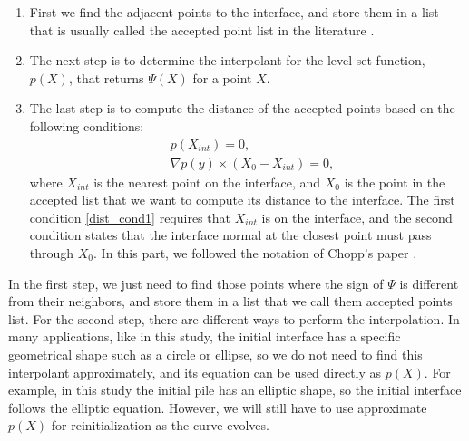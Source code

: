 \documentclass[review]{elsarticle}
\begin{document}
\begin{enumerate}
\item First we find the adjacent points to the interface, and store them in a list that is usually called the accepted point list in the literature \cite{Chopp2001}. 
\item The next step is to determine the interpolant for the level set function, $p(X)$, that returns $\varPsi(X)$ for a point $X$.
\item The last step is to compute the distance of the accepted points based on the following conditions:
\begin{subequations}
\begin{align}
&p(X_{int})=0,\label{dist_cond1} \\ 
&\nabla p(y) \times (X_0-X_{int})=0,\label{dist_cond2}
\end{align}
\end{subequations}
where $X_{int}$ is the nearest point on the interface, and $X_0$ is the point in the accepted list that we want to compute its distance to the interface. 
The first condition \eqref{dist_cond1} requires that $X_{int}$ is on the interface, and the second condition states that the interface normal at the closest point 
must pass through $X_0$. In this part, we followed the notation of Chopp's paper \citep{Chopp2001}.
\end{enumerate}

In the first step, we just need to find those points where the sign of $\varPsi$ is different from their neighbors, and store them in a list that we call them accepted points list. 
For the second step, there are different ways to perform the interpolation. In many applications, like in this study, the initial interface has a specific geometrical shape such as a circle or ellipse, 
so we do not need to find this interpolant approximately, and its equation can be used directly as $p(X)$. 
For example, in this study the initial pile has an elliptic shape, so the initial interface follows the elliptic equation. However,
we will still have to use  approximate $p(X)$ for reinitialization as the curve evolves.
\end{document}
